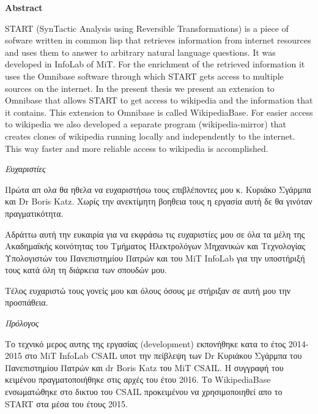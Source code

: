 {\vfill

\large\textbf{Abstract}

  START (SynTactic Analysis using Reversible Transformations) is a
  piece of sofware written in common lisp that retrieves information
  from internet resources and uses them to answer to arbitrary natural
  language questions. It was developed in InfoLab of MiT. For the
  enrichment of the retrieved information it uses the Omnibase
  software through which START gets access to multiple sources on the
  internet. In the present thesis we present an extension to Omnibase
  that allows START to get access to wikipedia and the information
  that it contains. This extension to Omnibase is called
  WikipediaBase. For easier access to wikipedia we also developed a
  separate program (wikipedia-mirror) that creates clones of wikipedia
  running locally and independently to the internet. This way faster
  and more reliable access to wikipedia is accomplished.


\clearpage

  \thispagestyle{plain}
  \vspace*{1in}
  \begin{center}
    \begin{Large}
      \textit{Ευχαριστίες}
    \end{Large}
  \end{center}

  Πρώτα απ ολα θα ηθελα να ευχαριστήσω τους επιβλέποντες μου κ. Κυριάκο
  Σγάρμπα και Dr Boris Katz. Χωρίς την ανεκτίμητη βοηθεια τους η εργασία
  αυτή δε θα γινόταν πραγματικότητα.

  Αδράττω αυτή την ευκαιρία για να εκφράσω τις ευχαριστίες μου σε όλα τα
  μέλη της Ακαδημαϊκής κοινότητας του Τμήματος Ηλεκτρολόγων Μηχανικών
  και Τεχνολογίας Υπολογιστών του Πανεπιστημίου Πατρών και του MiT
  InfoLab για την υποστήριξή τους κατά όλη τη διάρκεια των σπουδών μου.


  Τέλος ευχαριστώ τους γονείς μου και όλους όσους με στήριξαν σε αυτή
  μου την προσπάθεια.

  \afterpage{\blankpage}
  \newpage

  \thispagestyle{plain}
  \vspace*{1in}
  \begin{center}
    \begin{Large}
      \textit{Πρόλογος}
    \end{Large}
  \end{center}

  Το τεχνικό μερος αυτης της εργασίας (development) εκπονήθηκε κατα το
  έτος 2014-2015 στο MiT InfoLab CSAIL υποτ την πείβλεψη των Dr
  Κυριάκου Σγάρμπα του Πανεπιστημίου Πατρών και dr Boris Katz του MiT
  CSAIL. Η συγγραφή του κειμένου πραγματοποιήθηκε στις αρχές του έτου
  2016. Το WikipediaBase ενσωματώθηκε στο δικτυο του CSAIL προκειμένου
  να χρησιμοποιηθεί απο το START στα μέσα του έτους 2015.

  \afterpage{\blankpage}


}
